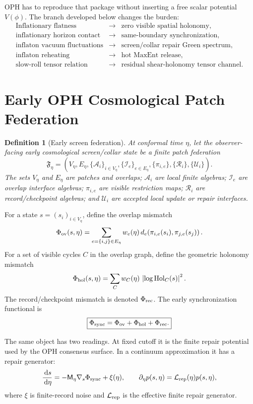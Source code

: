 \documentclass[11pt]{article}
\newtheorem{definition}[theorem]{Definition}
\newcommand{\Hol}{\mathrm{Hol}}
\newcommand{\dd}{\,\mathrm d}
\begin{document}
OPH has to reproduce that package without inserting a free scalar potential \(V(\phi)\). The branch
developed below changes the burden:
\[
\begin{array}{lll}
\text{Inflationary flatness} &\longrightarrow& \text{zero visible spatial holonomy},\\
\text{inflationary horizon contact} &\longrightarrow& \text{same-boundary synchronization},\\
\text{inflaton vacuum fluctuations} &\longrightarrow& \text{screen/collar repair Green spectrum},\\
\text{inflaton reheating} &\longrightarrow& \text{hot MaxEnt release},\\
\text{slow-roll tensor relation} &\longrightarrow& \text{residual shear-holonomy tensor channel}.
\end{array}
\]

\section{Early OPH Cosmological Patch Federation}

\begin{definition}[Early screen federation]
At conformal time \(\eta\), let the observer-facing early cosmological screen/collar state be a
finite patch federation
\[
\mathfrak F_\eta=
\left(
V_\eta,E_\eta,
\{\mathcal A_i\}_{i\in V_\eta},
\{\mathcal I_e\}_{e\in E_\eta},
\{\pi_{i,e}\},
\{\mathcal R_i\},
\{\mathcal U_i\}
\right).
\]
The sets \(V_\eta\) and \(E_\eta\) are patches and overlaps; \(\mathcal A_i\) are local finite
algebras; \(\mathcal I_e\) are overlap interface algebras; \(\pi_{i,e}\) are visible restriction
maps; \(\mathcal R_i\) are record/checkpoint algebras; and \(\mathcal U_i\) are accepted local
update or repair interfaces.
\end{definition}

For a state \(s=(s_i)_{i\in V_\eta}\), define the overlap mismatch
\[
\Phi_{\rm ov}(s,\eta)
=
\sum_{e=\{i,j\}\in E_\eta}
w_e(\eta)\,
d_e\!\left(\pi_{i,e}(s_i),\pi_{j,e}(s_j)\right).
\]
For a set of visible cycles \(C\) in the overlap graph, define the geometric holonomy mismatch
\[
\Phi_{\rm hol}(s,\eta)
=
\sum_C w_C(\eta)\,
\left|\log\Hol_C(s)\right|^2.
\]
The record/checkpoint mismatch is denoted \(\Phi_{\rm rec}\). The early synchronization functional is
\[
\boxed{
\Phi_{\rm sync}
=
\Phi_{\rm ov}+\Phi_{\rm hol}+\Phi_{\rm rec}.
}
\]

The same object has two readings. At fixed cutoff it is the finite repair potential used by the
OPH consensus surface. In a continuum approximation it has a repair generator:
\[
\frac{\dd s}{\dd\eta}
=
-\mathsf M_\eta\nabla_s\Phi_{\rm sync}+\xi(\eta),
\qquad
\partial_\eta p(s,\eta)=\mathcal L_{\rm rep}(\eta)p(s,\eta),
\]
where \(\xi\) is finite-record noise and \(\mathcal L_{\rm rep}\) is the effective finite repair
generator.
\end{document}
